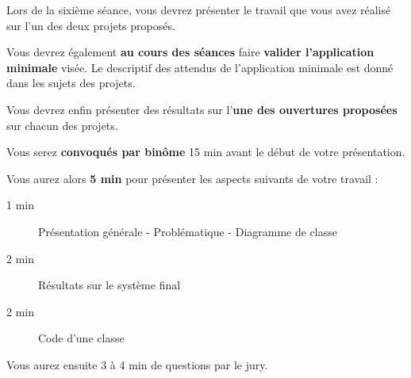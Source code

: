 \documentclass[10pt]{article} %
\def\dirName{6N-ONIP-bloc4_intro}
\begin{document}
\begin{minipage}[t]{.30\linewidth}
\hfill



\end{minipage} %


\newpage

\hypertarget{eval}{} %

Lors de la sixième séance, vous devrez présenter le travail que vous avez réalisé sur l'un des deux projets proposés.

Vous devrez également \textbf{au cours des séances} faire \textbf{valider l'application minimale} visée. Le descriptif des attendus de l'application minimale est donné dans les sujets des projets.

Vous devrez enfin présenter des résultats sur l'\textbf{une des ouvertures proposées} sur chacun des projets.

\bigskip

\bigskip

\begin{mdframed}[style=intextbox,frametitle={Présentation du travail}] %

Vous serez \textbf{convoqués par binôme} 15 min avant le début de votre présentation. 

\medskip 

Vous aurez alors \textbf{5 min} pour présenter les aspects suivants de votre travail :

\begin{description}
	\item[1 min] Présentation générale - Problématique - Diagramme de classe
	\item[2 min] Résultats sur le système final 
	\item[2 min] Code d'une classe
\end{description}

\medskip

Vous aurez ensuite 3 à 4 min de questions par le jury.

\end{mdframed}
\end{document}
